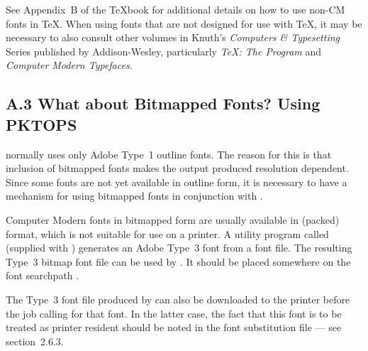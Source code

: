 See Appendix~B of the {\TeX}book for additional details 
on how to use non-CM fonts in {\TeX}.  
When using fonts that are not designed for use with {\TeX},
it may be necessary to also consult other volumes in Knuth's 
{\it Computers \& Typesetting\/} Series published by Addison-Wesley,
particularly {\it{\TeX}: The Program\/} and {\it Computer Modern Typefaces\/}.


\subsection{A.3 What about Bitmapped Fonts? Using PKTOPS} %

{\DVIPSONE} normally uses only Adobe Type~1 outline fonts. %
The reason for this is that inclusion of bitmapped fonts %
makes the {\PS} output produced resolution dependent.
Since some fonts are not yet available in outline form,
it is necessary to have a mechanism for using bitmapped
fonts in conjunction with {\DVIPSONE}. 


\quad\quad
Computer Modern fonts in bitmapped form are usually available in 
{\PK} (packed) format, which is not suitable for use on %
a {\PS} printer.
A utility program called {\PKTOPS} (supplied with {\DVIPSONE})
generates an Adobe Type~3 font from a {\PK} font file.
The resulting Type~3 bitmap font file can be used by {\DVIPSONE}.
It should be %
placed somewhere on the font searchpath%
. %

The Type~3 font file produced by {\PKTOPS} can also be downloaded
to the printer before the {\PS} job calling for that font. 
In the latter case, the fact that this font is to be treated as printer
resident should be noted in the font substitution file --- see section~2.6.3.

